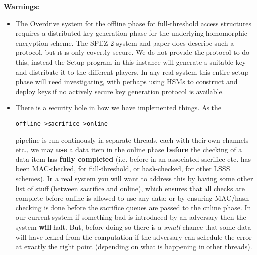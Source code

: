 \vspace{5mm}

\noindent
{\bf Warnings:}
\begin{itemize}
\item
The Overdrive system \cite{KPR} for the offline phase
for full-threshold access structures requires a distributed key 
generation phase for the underlying homomorphic encryption scheme. 
The SPDZ-2 system and paper does describe such a protocol, but it is only
covertly secure. 
We do not provide the protocol to do this, instead the
Setup program in this instance will generate a suitable
key and distribute it to the different players.
In any real system this entire setup phase will need
investigating, with perhaps using HSMs to construct and deploy
keys if no actively secure key generation protocol is available.
\item
There is a security hole in how we have implemented things.
As the
\begin{center}
  \verb+offline->sacrifice->online+ 
\end{center}
pipeline is run continously in separate threads, each with their own channels etc., we 
may {\bf use} a data item in the online phase {\bf before} the checking
of a data item has {\bf fully completed} (i.e. before in an associated
sacrifice etc. has been MAC-checked, for full-threshold,
or hash-checked, for other LSSS schemes). 
In a real system you will want to address this by having some
other list of stuff (between sacrifice and online), which
ensures that all checks are complete before online is
allowed to use any data; or by ensuring MAC/hash-checking is
done before the sacrifice queues are passed to the online phase.
In our current system if something bad is introduced by an adversary
then the system {\bf will} halt.
But, before doing so there is a {\em small} chance that some data will 
have leaked from the computation if the adversary can schedule the 
error at exactly the right point (depending on what is happening in
other threads).
\end{itemize}


